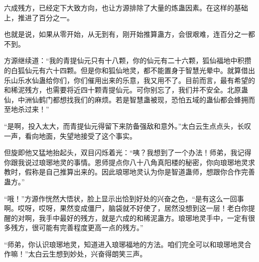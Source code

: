 \begin{this_body}
六成残方，已经定下大致方向，也让方源排除了大量的炼蛊因素。在这样的基础上，推进了百分之一。

也就是说，如果从零开始，从无到有，刚开始推算蛊方，会很艰难，连百分之一都不到。

方源继续道：“我的青提仙元只有十八颗，你的仙元有二十六颗，狐仙福地中积攒的白狐仙元有六十四颗。但是你和狐仙地灵，都不能置身于智慧光晕中。就算借出乐山乐水仙蛊给你们，你们催用出来的乐意，我又用不了。目前而言，最有希望的和稀泥残方，也需要将近四十颗青提仙元。可你别忘了，我们并不安全。北原蛊仙，中洲仙鹤门都想找我们的麻烦。若是智慧蛊被现，恐怕五域的蛊仙都会蜂拥而至地杀过来！”

“是啊，投入太大，而青提仙元得留下来防备强敌和意外。”太白云生点点头，长叹一声，看向地面，失望地接受了这个事实。

但旋即他又猛地抬起头，双目闪烁着光：“咦？我想到了一个办法！师弟，我记得你跟我说过琅琊地灵的事情。恩师提点你八十八角真阳楼的秘密，你向琅琊地灵求教时，假称是自己推算出来的。因此琅琊地灵认为你是智道蛊师，想跟你合作完善蛊方。”

“哦！”方源作恍然大悟状，脸上显示出恰到好处的兴奋之色，“是有这么一回事啊。哎呀，哎呀，果然变成僵尸，脑袋就不好使了，居然没想到这一层！老白你提醒的对啊，我手中最好的残方，就是六成的和稀泥蛊方。琅琊地灵手中，一定有很多残方，很可能有完善程度更高一点的残方。”

“师弟，你认识琅琊地灵，知道进入琅琊福地的方法。咱们完全可以和琅琊地灵合作嘛！”太白云生想到妙处，兴奋得朗笑三声。

\end{this_body}

